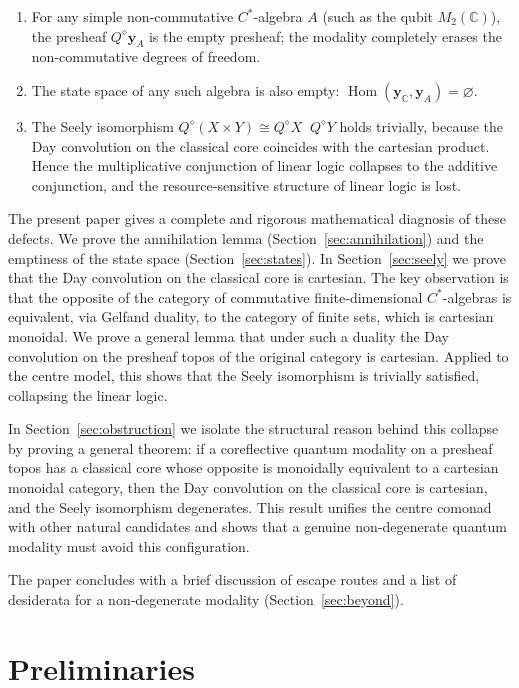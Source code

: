 \documentclass[12pt,a4paper]{article}
\theoremstyle{plain}
\theoremstyle{definition}
\DeclareMathOperator{\Day}{\otimes_{\mathrm{Day}}}
\DeclareMathOperator{\Hom}{Hom}
\begin{document}
\begin{enumerate}[nosep]
\item For any simple non‑commutative \(C^{*}\)-algebra \(A\) (such as the qubit \(M_2(\mathbb{C})\)), the presheaf \(Q^{\diamond}\mathbf{y}_A\) is the empty presheaf; the modality completely erases the non‑commutative degrees of freedom.
\item The state space of any such algebra is also empty: \(\Hom(\mathbf{y}_{\mathbb{C}}, \mathbf{y}_A) = \varnothing\).
\item The Seely isomorphism \(Q^{\diamond}(X\times Y) \cong Q^{\diamond}X \Day Q^{\diamond}Y\) holds trivially, because the Day convolution on the classical core coincides with the cartesian product.  Hence the multiplicative conjunction of linear logic collapses to the additive conjunction, and the resource‑sensitive structure of linear logic is lost.
\end{enumerate}

The present paper gives a complete and rigorous mathematical diagnosis of these defects.  We prove the annihilation lemma (Section~\ref{sec:annihilation}) and the emptiness of the state space (Section~\ref{sec:states}).  In Section~\ref{sec:seely} we prove that the Day convolution on the classical core is cartesian.  The key observation is that the opposite of the category of commutative finite‑dimensional \(C^{*}\)-algebras is equivalent, via Gelfand duality, to the category of finite sets, which is cartesian monoidal.  We prove a general lemma that under such a duality the Day convolution on the presheaf topos of the original category is cartesian.  Applied to the centre model, this shows that the Seely isomorphism is trivially satisfied, collapsing the linear logic.

In Section~\ref{sec:obstruction} we isolate the structural reason behind this collapse by proving a general theorem: if a coreflective quantum modality on a presheaf topos has a classical core whose opposite is monoidally equivalent to a cartesian monoidal category, then the Day convolution on the classical core is cartesian, and the Seely isomorphism degenerates.  This result unifies the centre comonad with other natural candidates and shows that a genuine non‑degenerate quantum modality must avoid this configuration.

The paper concludes with a brief discussion of escape routes and a list of desiderata for a non‑degenerate modality (Section~\ref{sec:beyond}).

\section{Preliminaries}
\label{sec:prelim}
\end{document}
